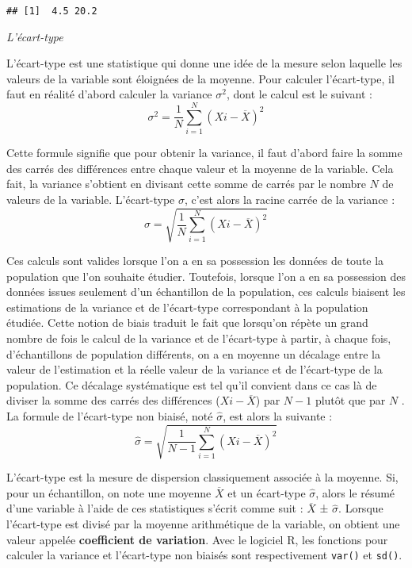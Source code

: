 \documentclass[
]{book}
\begin{document}
\begin{verbatim}
## [1]  4.5 20.2
\end{verbatim}

\emph{L'écart-type}

L'écart-type est une statistique qui donne une idée de la mesure selon laquelle les valeurs de la variable sont éloignées de la moyenne. Pour calculer l'écart-type, il faut en réalité d'abord calculer la variance \(\sigma^2\), dont le calcul est le suivant :
\[\sigma^2 = \frac{1}{N}\sum_{i=1}^{N} (X{i} - \overline{X})^2\]

Cette formule signifie que pour obtenir la variance, il faut d'abord faire la somme des carrés des différences entre chaque valeur et la moyenne de la variable. Cela fait, la variance s'obtient en divisant cette somme de carrés par le nombre \(N\) de valeurs de la variable. L'écart-type \(\sigma\), c'est alors la racine carrée de la variance :
\[\sigma = \sqrt{\frac{1}{N}\sum_{i=1}^{N} (X{i} - \overline{X})^2}\]

Ces calculs sont valides lorsque l'on a en sa possession les données de toute la population que l'on souhaite étudier. Toutefois, lorsque l'on a en sa possession des données issues seulement d'un échantillon de la population, ces calculs biaisent les estimations de la variance et de l'écart-type correspondant à la population étudiée. Cette notion de biais traduit le fait que lorsqu'on répète un grand nombre de fois le calcul de la variance et de l'écart-type à partir, à chaque fois, d'échantillons de population différents, on a en moyenne un décalage entre la valeur de l'estimation et la réelle valeur de la variance et de l'écart-type de la population. Ce décalage systématique est tel qu'il convient dans ce cas là de diviser la somme des carrés des différences (\(X{i} - \overline{X}\)) par \(N-1\) plutôt que par \(N\) \autocite{grenierQuelleEstBonne2007}. La formule de l'écart-type non biaisé, noté \emph{\(\hat{\sigma}\)}, est alors la suivante :
\[\hat{\sigma} = \sqrt{\frac{1}{N-1}\sum_{i=1}^{N} (X{i} - \overline{X})^2}\]

L'écart-type est la mesure de dispersion classiquement associée à la moyenne. Si, pour un échantillon, on note une moyenne \(\overline{X}\) et un écart-type \(\hat{\sigma}\), alors le résumé d'une variable à l'aide de ces statistiques s'écrit comme suit : \(\overline{X}\) ± \(\hat{\sigma}\). Lorsque l'écart-type est divisé par la moyenne arithmétique de la variable, on obtient une valeur appelée \textbf{coefficient de variation}. Avec le logiciel R, les fonctions pour calculer la variance et l'écart-type non biaisés sont respectivement \texttt{var()} et \texttt{sd()}.
\end{document}
